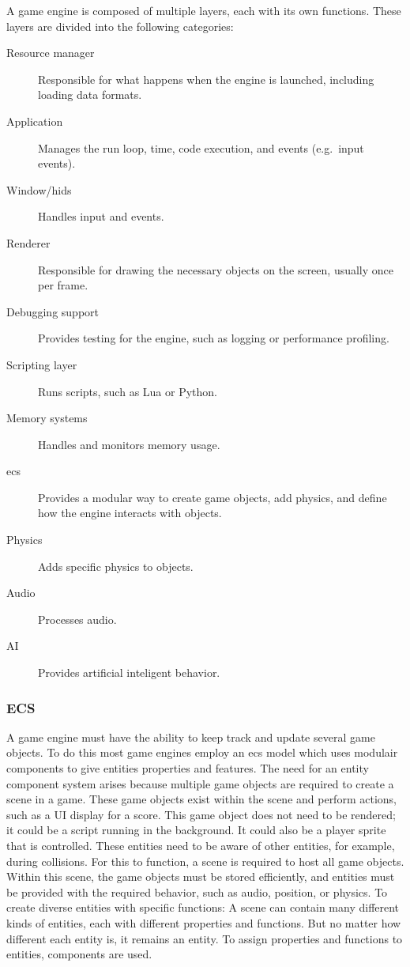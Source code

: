 \documentclass{projdoc}
\begin{document}
A game engine is composed of multiple layers, each with its own functions. These
layers are divided into the following categories:\noparbreak
\begin{description}
	\item[Resource manager] Responsible for what happens when the engine is launched,
		including loading data formats.
	\item[Application] Manages the run loop, time, code execution, and events
		(e.g.~input events).
	\item[Window/\glspl{hid}] Handles input and events.
	\item[Renderer] Responsible for drawing the necessary objects on the screen,
		usually once per frame.
	\item[Debugging support] Provides testing for the engine, such as logging or
		performance profiling.
	\item[Scripting layer] Runs scripts, such as Lua or Python.
	\item[Memory systems] Handles and monitors memory usage.
	\item[\gls{ecs}] Provides a modular way to create game objects, add physics, and
		define how the engine interacts with objects.
	\item[Physics] Adds specific physics to objects.
	\item[Audio] Processes audio.
	\item[AI] Provides artificial inteligent behavior.
\end{description}

\subsubsection{ECS}

A game engine must have the ability to keep track and update several game objects. To
do this most game engines employ an \gls{ecs} model which uses modulair components to
give entities properties and features. The need for an entity component system arises
because multiple game objects are required to create a scene in a game. These game
objects exist within the scene and perform actions, such as a UI display for a score.
This game object does not need to be rendered; it could be a script running in the
background. It could also be a player sprite that is controlled. These entities need
to be aware of other entities, for example, during collisions. For this to function,
a scene is required to host all game objects. Within this scene, the game objects
must be stored efficiently, and entities must be provided with the required behavior,
such as audio, position, or physics. To create diverse entities with specific
functions: A scene can contain many different kinds of entities, each with different
properties and functions. But no matter how different each entity is, it remains an
entity. To assign properties and functions to entities, components are used.
\end{document}
